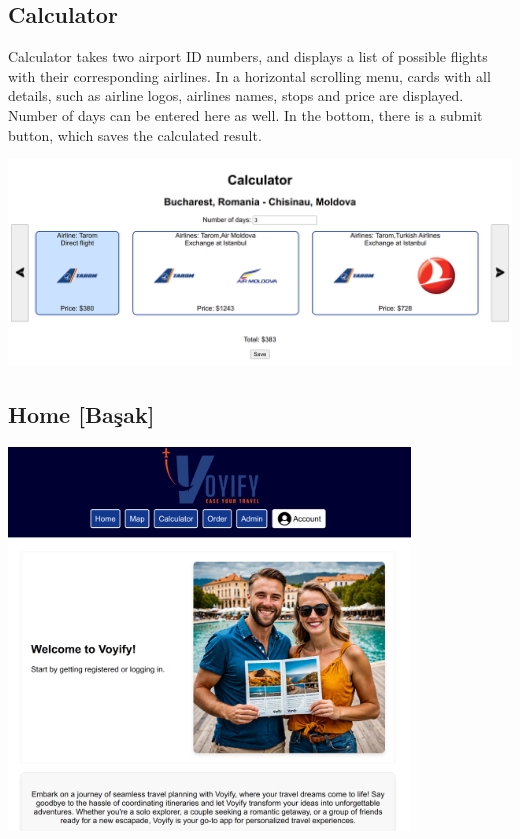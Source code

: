 \documentclass[12pt]{article}
\begin{document}
\subsection{Calculator}
\label{sec:orgb4248df}
Calculator takes two airport ID numbers, and displays a list of possible flights with their corresponding airlines. In a horizontal scrolling menu, cards with all details, such as airline logos, airlines names, stops and price are displayed. Number of days can be entered here as well. In the bottom, there is a submit button, which saves the calculated result.
\begin{center}
\includegraphics[width=\textwidth]{./images/calculator.png}
\end{center}

\subsection{Home [Başak]}
\label{sec:org2a628ef}
\begin{center}
\includegraphics[width=0.8\textwidth]{./images/home.png}
\end{center}
\end{document}
